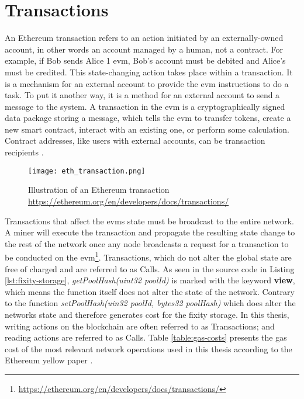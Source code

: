 \section{Transactions}\label{sec:tx-cost}
An Ethereum transaction refers to an action initiated by an externally-owned account, in other words an account managed by a human, not a contract. For example, if Bob sends Alice 1 \acrshort{evm}, Bob's account must be debited and Alice's must be credited. This state-changing action takes place within a transaction. It is a mechanism for an external account to provide the \acrshort{evm} instructions to do a task. To put it another way, it is a method for an external account to send a message to the system. A transaction in the \acrshort{evm} is a cryptographically signed data package storing a message, which tells the \acrshort{evm} to transfer tokens, create a new smart contract, interact with an existing one, or perform some calculation. Contract addresses, like users with external accounts, can be transaction recipients \cite[60]{dannen2017introducing}. 
\begin{figure}[t]
    \centering
    \texttt{[image: eth\_transaction.png]}
    \caption{Illustration of an Ethereum transaction \url{https://ethereum.org/en/developers/docs/transactions/}}
\end{figure}
Transactions that affect the \acrshort{evm}s state must be broadcast to the entire network. A miner will execute the transaction and propagate the resulting state change to the rest of the network once any node broadcasts a request for a transaction to be conducted on the \acrshort{evm}\footnote{\url{https://ethereum.org/en/developers/docs/transactions/}}.
Transactions, which do not alter the global state are free of charged and are referred to as Calls. As seen in the source code in Listing \ref{lst:fixity-storage}, \textit{getPoolHash(uint32 poolId)} is marked with the keyword \textbf{view}, which means the function itself does not alter the state of the network. Contrary to the function \textit{setPoolHash(uin32 poolId, bytes32 poolHash)} which does alter the networks state and therefore generates cost for the fixity storage. In this thesis, writing actions on the blockchain are often referred to as Transactions; and reading actions are referred to as Calls.
Table \ref{table:gas-costs} presents the gas cost of the most relevant network operations used in this thesis according to the Ethereum yellow paper \cite[27]{wood2014ethereum}.
